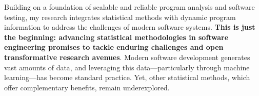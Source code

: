 \documentclass{article}
\begin{document}
\noindent


Building on a foundation of scalable and reliable program analysis and software testing, my research integrates statistical methods with dynamic program information to address the challenges of modern software systems. \textbf{This is just the beginning: advancing statistical methodologies in software engineering promises to tackle enduring challenges and open transformative research avenues}.
% 
Modern software development generates vast amounts of data, and leveraging this data—particularly through machine learning—has become standard practice. Yet, other statistical methods, which offer complementary benefits, remain underexplored. 
\end{document}
